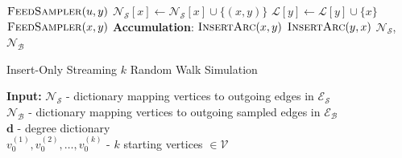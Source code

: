 \documentclass{report}
\newcommand{\algoname}[1]{\textnormal{\textsc{#1}}}
\begin{document}
\begin{algorithm}[htbp]
\begin{flushleft}
\begin{algorithmic}[1]
					\State $\algoname{FeedSampler}(u,y)$
				\EndFor
			\EndIf
				\State $\mathcal{N}_\mathcal{S}[x] \gets \mathcal{N}_\mathcal{S}[x] \cup \{(x, y)\}$
				\State $\mathcal{L}[y] \gets \mathcal{L}[y] \cup \{x\}$
			\Else
				\State $\algoname{FeedSampler}(x,y)$
			\EndIf
		\EndFunction
	\Statex \textbf{Accumulation}:
			\State $\algoname{InsertArc}(x, y)$
			\State $\algoname{InsertArc}(y, x)$
		\EndFor
		\State \Return $\mathcal{N}_\mathcal{S}$, $\mathcal{N}_\mathcal{B}$
\end{algorithmic}
\end{flushleft}
\end{algorithm}

\begin{algorithm}[htbp] 
\caption{Insert-Only Streaming $k$ Random Walk Simulation}\label{alg:rw:serial:insert-only:simulation}
\begin{flushleft}
        \textbf{Input:} 		$\mathcal{N}_\mathcal{S}$ - dictionary mapping vertices to outgoing edges in $\mathcal{E}_\mathcal{S}$ \\
        	\hspace{3.15em}	$\mathcal{N}_\mathcal{B}$ - dictionary mapping vertices to outgoing sampled edges in $\mathcal{E}_\mathcal{B}$ \\
        	\hspace{3.15em}	$\mathbf{d}$ - degree dictionary \\
        	\hspace{3.15em}	$v_0^{(1)}, v_0^{(2)}, \dots, v_0^{(k)}$ - $k$ starting vertices $\in \mathcal{V}$ \\

\end{flushleft}
\end{algorithm}
\end{document}
